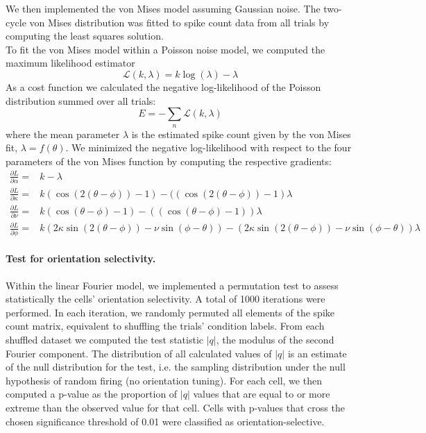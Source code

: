\documentclass[10pt]{article}
\begin{document}
We then implemented the von Mises model assuming Gaussian noise. The two-cycle von Mises distribution was fitted to spike count data from all trials by computing the least squares solution. \\
To fit the von Mises model within a Poisson noise model, we computed the maximum likelihood estimator
\begin{equation*}
\mathcal{L}(k,\lambda) = k\log(\lambda)-\lambda
\end{equation*}
As a cost function we calculated the negative log-likelihood of the Poisson distribution summed over all trials: 
\begin{equation*}
E = - \sum_n \mathcal{L}(k,\lambda)
\end{equation*}
where the mean parameter $\lambda$ is the estimated spike count given by the von Mises fit, $\lambda = f(\theta)$. We minimized the negative log-likelihood with respect to the four parameters of the von Mises function by computing the respective gradients:
\begin{align*}
 \frac{\partial L}{\partial \alpha} = &k - \lambda  \\
 \frac{\partial L}{\partial \kappa} = &k(\cos(2(\theta-\phi))-1) - ((\cos(2(\theta-\phi))-1) \lambda \\
 \frac{\partial L}{\partial \nu} = &k(\cos(\theta-\phi)-1) - ((\cos(\theta-\phi)-1)) \lambda \\
 \frac{\partial L}{\partial \phi} =  & k(2\kappa \sin(2(\theta-\phi)) - \nu \sin(\phi-\theta)) -(2\kappa \sin(2(\theta-\phi))- \nu \sin(\phi-\theta)) \lambda
\end{align*}

\paragraph{Test for orientation selectivity.} Within the linear Fourier model, we implemented a permutation test to assess statistically the cells' orientation selectivity. A total of 1000 iterations were performed. In each iteration, we randomly permuted all elements of the spike count matrix, equivalent to shuffling the trials' condition labels. From each shuffled dataset we computed the test statistic $|q|$, the modulus of the second Fourier component. The distribution of all calculated values of $|q|$ is an estimate of the null distribution for the test, i.e. the sampling distribution under the null hypothesis of random firing (no orientation tuning). For each cell, we then computed a p-value as the proportion of $|q|$ values that are equal to or more extreme than the observed value for that cell. Cells with p-values that cross the chosen significance threshold of 0.01 were classified as orientation-selective.
\end{document}
